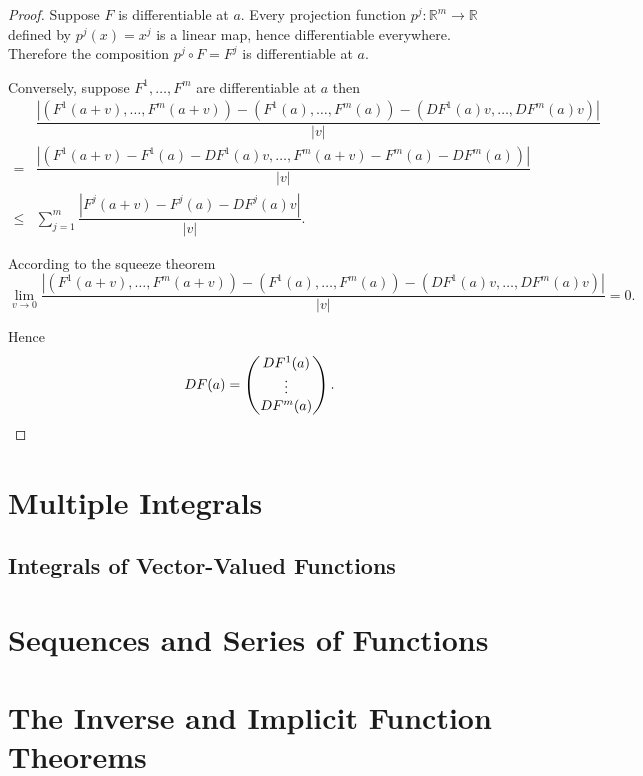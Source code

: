 \begin{proof}
    Suppose \( F \) is differentiable at \( a \). Every projection function \( p^{j}: \mathbb{R}^{m} \to \mathbb{R} \) defined by \( p^{j}(x) = x^{j} \) is a linear map, hence differentiable everywhere. Therefore the composition \( p^{j} \circ F = F^{j} \) is differentiable at \( a \).

    Conversely, suppose \( F^{1}, \ldots, F^{m} \) are differentiable at \( a \) then
    \begingroup
    \allowdisplaybreaks%
    \begin{align*}
            & \dfrac{\left\vert {(F^{1}(a + v), \ldots, F^{m}(a + v))} - {(F^{1}(a), \ldots, F^{m}(a))} - {(DF^{1}(a)v, \ldots, DF^{m}(a)v)} \right\vert}{\left\vert v \right\vert} \\
        =   & \dfrac{\left\vert (F^{1}(a + v) - F^{1}(a) - DF^{1}(a)v, \ldots, F^{m}(a + v) - F^{m}(a) - DF^{m}(a)) \right\vert}{\left\vert v \right\vert}                          \\
        \le & \sum_{j=1}^{m} \dfrac{\left\vert F^{j}(a + v) - F^{j}(a) - DF^{j}(a)v \right\vert}{\left\vert v \right\vert}.
    \end{align*}
    \endgroup

    According to the squeeze theorem
    \[
        \lim\limits_{v \to 0} \dfrac{\left\vert {(F^{1}(a + v), \ldots, F^{m}(a + v))} - {(F^{1}(a), \ldots, F^{m}(a))} - {(DF^{1}(a)v, \ldots, DF^{m}(a)v)} \right\vert}{\left\vert v \right\vert} = 0.
    \]

    Hence
    \[
        DF(a) = \begin{pmatrix} DF^{1}(a) \\ \vdots \\ DF^{m}(a) \end{pmatrix}. \qedhere
    \]
\end{proof}

\section{Multiple Integrals}

\subsection{Integrals of Vector-Valued Functions}

\section{Sequences and Series of Functions}

\section{The Inverse and Implicit Function Theorems}
